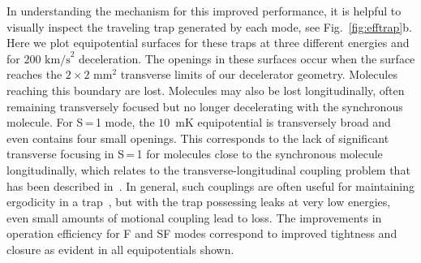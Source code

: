 \documentclass[%
 reprint,
 amsmath,amssymb,
 aps,
prl,
]{revtex4-1}
\begin{document}
In understanding the mechanism for this improved performance, it is helpful to visually inspect the traveling trap generated by each mode, see Fig.~\ref{fig:efftrap}b.
Here we plot equipotential surfaces for these traps at three different energies and for $200 \text{ km/s}^2$ deceleration.
The openings in these surfaces occur when the surface reaches the $2 \times 2\text{ mm}^2$ transverse limits of our decelerator geometry. Molecules reaching this boundary are lost.
Molecules may also be lost longitudinally, often remaining transversely focused but no longer decelerating with the synchronous molecule.
For S\,=\,1 mode, the $10$~mK equipotential is transversely broad and even contains four small openings.
This corresponds to the lack of significant transverse focusing in S\,=\,1 for molecules close to the synchronous molecule longitudinally, which relates to the transverse-longitudinal coupling problem that has been described in~\cite{VanDeMeerakker2006}.
In general, such couplings are often useful for maintaining ergodicity in a trap~\cite{Surkov1996}, but with the trap possessing leaks at very low energies, even small amounts of motional coupling lead to loss. 
The improvements in operation efficiency for F and SF modes correspond to improved tightness and closure as evident in all equipotentials shown.
\end{document}

